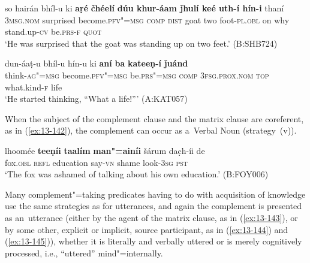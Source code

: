 \begin{exe}
\ex
\label{ex:13-140}
\gll so hairán bhíl-u ki \textbf{aṛé} \textbf{čhéelí} \textbf{ dúu khur-áam ǰhulí keé uth-í hín-i} thaní \\
\textsc{3msg.nom}  surprised become.\textsc{pfv"=msg} \textsc{comp} \textsc{dist} goat  two foot-\textsc{pl.obl} on why stand.up-\textsc{cv} be.\textsc{prs-f} \textsc{quot} \\
\glt `He was surprised that the goat was standing up on two feet.' (B:SHB724)

\ex
\label{ex:13-141}
\gll dun-áaṭ-u bhíl-u hín-u ki  \textbf{aní} \textbf{ba} \textbf{kateeṇ-í} \textbf{ǰuánd} \\
think-\textsc{ag"=msg} become.\textsc{pfv"=msg} be.\textsc{prs"=msg} \textsc{comp}  \textsc{3fsg.prox.nom} \textsc{top} what.kind-\textsc{f} life  \\
\glt `He started thinking, ``What a life!''' (A:KAT057) 
\end{exe}

When the subject of the complement clause and the matrix clause are coreferent, as in (\ref{ex:13-142}), the complement can occur as a~Verbal Noun (strategy~(v)).

\begin{exe}
\ex
\label{ex:13-142}
\gll lhoomée \textbf{teeṇíi} \textbf{taalím} \textbf{man"=ainíi} šárum  dac̣h-íi de \\
fox.\textsc{obl} \textsc{ refl} education say-\textsc{vn} shame look-\textsc{3sg} \textsc{pst} \\
\glt `The fox was ashamed of talking about his own education.' (B:FOY006) 
\end{exe}

 Many complement"=taking predicates having to do with acquisition of knowledge use the same strategies as for utterances, and again the complement is presented as an~utterance (either by the agent of the matrix clause, as in (\ref{ex:13-143}), or by some other, explicit or implicit, source participant, as in (\ref{ex:13-144}) and (\ref{ex:13-145})), whether it is literally and verbally uttered or is merely cognitively processed, i.e., ``uttered'' mind"=internally. 

